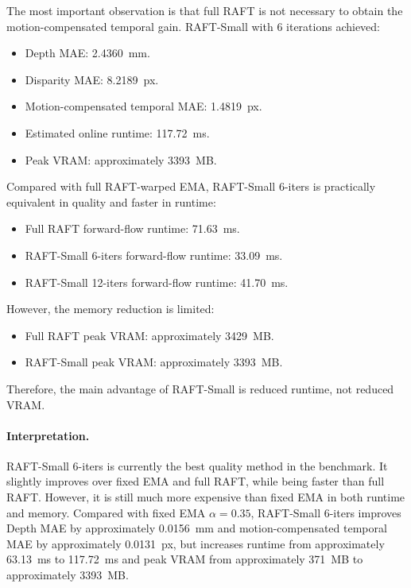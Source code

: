\documentclass[11pt,a4paper]{article}
\begin{document}
The most important observation is that full RAFT is not necessary to obtain the motion-compensated temporal gain. RAFT-Small with 6 iterations achieved:

\begin{itemize}[leftmargin=*]
\item Depth MAE: \SI{2.4360}{mm}.
\item Disparity MAE: \SI{8.2189}{px}.
\item Motion-compensated temporal MAE: \SI{1.4819}{px}.
\item Estimated online runtime: \SI{117.72}{ms}.
\item Peak VRAM: approximately \SI{3393}{MB}.
\end{itemize}

Compared with full RAFT-warped EMA, RAFT-Small 6-iters is practically equivalent in quality and faster in runtime:

\begin{itemize}[leftmargin=*]
\item Full RAFT forward-flow runtime: \SI{71.63}{ms}.
\item RAFT-Small 6-iters forward-flow runtime: \SI{33.09}{ms}.
\item RAFT-Small 12-iters forward-flow runtime: \SI{41.70}{ms}.
\end{itemize}

However, the memory reduction is limited:

\begin{itemize}[leftmargin=*]
\item Full RAFT peak VRAM: approximately \SI{3429}{MB}.
\item RAFT-Small peak VRAM: approximately \SI{3393}{MB}.
\end{itemize}

Therefore, the main advantage of RAFT-Small is reduced runtime, not reduced VRAM.

\paragraph{Interpretation.}
RAFT-Small 6-iters is currently the best quality method in the benchmark. It slightly improves over fixed EMA and full RAFT, while being faster than full RAFT. However, it is still much more expensive than fixed EMA in both runtime and memory. Compared with fixed EMA $\alpha=0.35$, RAFT-Small 6-iters improves Depth MAE by approximately \SI{0.0156}{mm} and motion-compensated temporal MAE by approximately \SI{0.0131}{px}, but increases runtime from approximately \SI{63.13}{ms} to \SI{117.72}{ms} and peak VRAM from approximately \SI{371}{MB} to approximately \SI{3393}{MB}.
\end{document}
